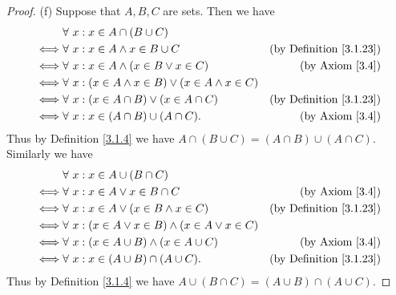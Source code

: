 \begin{proof}{(f)}
Suppose that \(A, B, C\) are sets.
Then we have
\begin{align*}
& \forall\ x : x \in A \cap (B \cup C) \\
\iff & \forall\ x : x \in A \land x \in B \cup C & \text{(by Definition \ref{3.1.23})} \\
\iff & \forall\ x : x \in A \land (x \in B \lor x \in C) & \text{(by Axiom \ref{3.4})} \\
\iff & \forall\ x : (x \in A \land x \in B) \lor (x \in A \land x \in C) \\
\iff & \forall\ x : (x \in A \cap B) \lor (x \in A \cap C) & \text{(by Definition \ref{3.1.23})} \\
\iff & \forall\ x : x \in (A \cap B) \cup (A \cap C). & \text{(by Axiom \ref{3.4})}
\end{align*}
Thus by Definition \ref{3.1.4} we have \(A \cap (B \cup C) = (A \cap B) \cup (A \cap C)\).
Similarly we have
\begin{align*}
& \forall\ x : x \in A \cup (B \cap C) \\
\iff & \forall\ x : x \in A \lor x \in B \cap C & \text{(by Axiom \ref{3.4})} \\
\iff & \forall\ x : x \in A \lor (x \in B \land x \in C) & \text{(by Definition \ref{3.1.23})} \\
\iff & \forall\ x : (x \in A \lor x \in B) \land (x \in A \lor x \in C) \\
\iff & \forall\ x : (x \in A \cup B) \land (x \in A \cup C) & \text{(by Axiom \ref{3.4})} \\
\iff & \forall\ x : x \in (A \cup B) \cap (A \cup C). & \text{(by Definition \ref{3.1.23})}
\end{align*}
Thus by Definition \ref{3.1.4} we have \(A \cup (B \cap C) = (A \cup B) \cap (A \cup C)\).
\end{proof}


